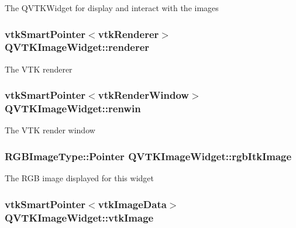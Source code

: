 The Q\-V\-T\-K\-Widget for display and interact with the images \hypertarget{class_q_v_t_k_image_widget_a06c273e6e390e8e860fa4c0c932a2cf8}{
\subsubsection[{renderer}]{\setlength{\rightskip}{0pt plus 5cm}vtk\-Smart\-Pointer$<$vtk\-Renderer$>$ {\bf Q\-V\-T\-K\-Image\-Widget\-::renderer}}}\label{d8/dd7/class_q_v_t_k_image_widget_a06c273e6e390e8e860fa4c0c932a2cf8}
The V\-T\-K renderer \hypertarget{class_q_v_t_k_image_widget_a1ffdb2716a14bd2cb4dc845c50fc474c}{
\subsubsection[{renwin}]{\setlength{\rightskip}{0pt plus 5cm}vtk\-Smart\-Pointer$<$vtk\-Render\-Window$>$ {\bf Q\-V\-T\-K\-Image\-Widget\-::renwin}}}\label{d8/dd7/class_q_v_t_k_image_widget_a1ffdb2716a14bd2cb4dc845c50fc474c}
The V\-T\-K render window \hypertarget{class_q_v_t_k_image_widget_ae8cea614979ccdb6fe65551c8269b116}{
\subsubsection[{rgb\-Itk\-Image}]{\setlength{\rightskip}{0pt plus 5cm}R\-G\-B\-Image\-Type\-::\-Pointer {\bf Q\-V\-T\-K\-Image\-Widget\-::rgb\-Itk\-Image}}}\label{d8/dd7/class_q_v_t_k_image_widget_ae8cea614979ccdb6fe65551c8269b116}
The R\-G\-B image displayed for this widget \hypertarget{class_q_v_t_k_image_widget_aa55aaf6e037ee4d789449ff3d365201b}{
\subsubsection[{vtk\-Image}]{\setlength{\rightskip}{0pt plus 5cm}vtk\-Smart\-Pointer$<$vtk\-Image\-Data$>$ {\bf Q\-V\-T\-K\-Image\-Widget\-::vtk\-Image}}}\label{d8/dd7/class_q_v_t_k_image_widget_aa55aaf6e037ee4d789449ff3d365201b}
